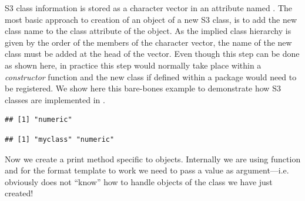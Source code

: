 \documentclass[krantz2]{krantz}\usepackage{knitr}%
\begin{document}
S3 class information is stored as a character vector in an attribute named . The most basic approach to creation of an object of a new S3 class, is to add the new class name to the class attribute of the object. As the implied class hierarchy is given by the order of the members of the character vector, the name of the new class must be added at the head of the vector. Even though this step can be done as shown here, in practice this step would normally take place within a \emph{constructor} function and the new class if defined within a package would need to be registered. We show here this bare-bones example to demonstrate how S3 classes are implemented in \Rlang.

\begin{knitrout}\footnotesize
{}\color{fgcolor}\begin{kframe}
\begin{alltt}
 \hlkwb{<-} 
\end{alltt}
\begin{verbatim}
## [1] "numeric"
\end{verbatim}
\begin{alltt}
 \hlkwb{<-} \hlstd{(}\hlstd{,} 
\end{alltt}
\begin{verbatim}
## [1] "myclass" "numeric"
\end{verbatim}
\end{kframe}
\end{knitrout}

Now we create a print method specific to  objects. Internally we are using function  and for the format template to work we need to pass a  value as argument---i.e. obviously  does not ``know'' how to handle objects of the class we have just created!

\begin{knitrout}\footnotesize
{}\color{fgcolor}
\end{knitrout}
\end{document}
